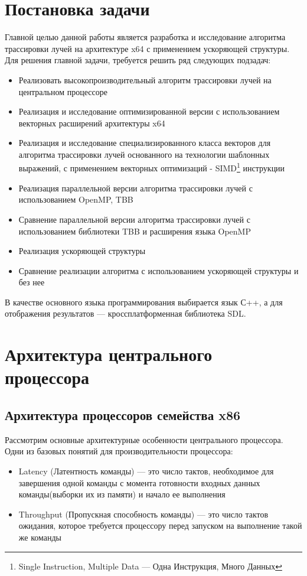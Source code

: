 \documentclass[12pt, a4paper]{article}
\begin{document}
\newpage 
\section{Постановка задачи}
Главной целью данной работы является разработка и исследование алгоритма трассировки лучей на архитектуре x64 с применением ускоряющей структуры. Для решения главной задачи, требуется решить ряд следующих подзадач:
\begin{itemize}
	\item Реализовать высокопроизводительный алгоритм трассировки лучей на центральном процессоре
	\item Реализация и исследование оптимизированной версии с использованием векторных расширений архитектуры x64
	\item Реализация и исследование специализированного класса векторов для алгоритма трассировки лучей основанного на технологии шаблонных выражений, с применением векторных оптимизаций  - SIMD\footnote{ Single Instruction, Multiple Data — Одна Инструкция, Много Данных } инструкции 
	\item Реализация параллельной версии алгоритма трассировки лучей с использованием OpenMP, TBB
	\item Сравнение параллельной версии алгоритма трассировки лучей с использованием библиотеки TBB и расширения языка OpenMP
	\item Реализация ускоряющей структуры
	\item Сравнение реализации алгоритма с использованием ускоряющей структуры и без нее
\end{itemize}
   В качестве основного языка программирования выбирается язык С++, а для отображения результатов — кроссплатформенная библиотека SDL. 
   
\newpage 
\section{Архитектура центрального процессора}
\subsection{Архитектура процессоров семейства x86}
Рассмотрим основные архитектурные особенности центрального процессора.
Одни из базовых понятий для производительности процессора:
\begin{itemize}
	\item Latency (Латентность команды) --- это число тактов, необходимое для завершения одной команды с момента готовности входных данных команды(выборки их из памяти) и начало ее выполнения
	\item Throughput (Пропускная способность команды) --- это число тактов ожидания, которое требуется процессору перед запуском на выполнение такой же команды
\end{itemize}   
\end{document}
